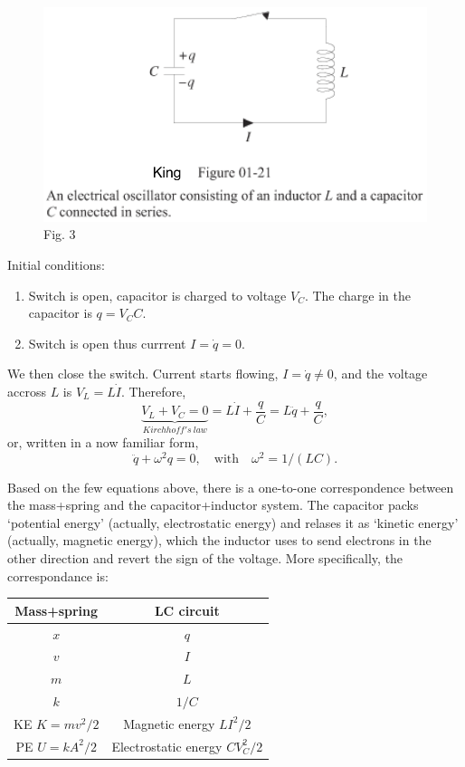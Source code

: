 \documentclass[11pt]{article}
\makeatletter
\def\maxwidth{\ifdim\Gin@nat@width>\linewidth\linewidth
    \else\Gin@nat@width\fi}
\let\Oldincludegraphics\includegraphics
\renewcommand{\includegraphics}[1]{\Oldincludegraphics[width=.8\maxwidth]{#1}}
\makeatother
\begin{document}
    \begin{figure}
\centering
\includegraphics{LC_circuit.png}
\caption{Fig. 3}
\end{figure}

    Initial conditions:

\begin{enumerate}
\def\labelenumi{\arabic{enumi}.}
\item
  Switch is open, capacitor is charged to voltage \(V_C\). The charge in
  the capacitor is \(q = V_C C\).
\item
  Switch is open thus currrent \(I=\dot{q} = 0\).
\end{enumerate}

    We then close the switch. Current starts flowing, \(I = \dot q \neq 0\),
and the voltage accross \(L\) is \(V_L = L \dot I\). Therefore,
\[ \underbrace{V_L+V_C = 0}_{Kirchhof\!f's\ law} = L\dot I + \frac{q}C  = L\ddot q + \frac{q}C, \]
or, written in a now familiar form,
\[ \boxed{\ddot q + \omega^2 q = 0, \quad \textrm{with}\quad \omega^2 = 1/(LC).} \]

    Based on the few equations above, there is a one-to-one correspondence
between the mass+spring and the capacitor+inductor system. The capacitor
packs `potential energy' (actually, electrostatic energy) and relases it
as `kinetic energy' (actually, magnetic energy), which the inductor uses
to send electrons in the other direction and revert the sign of the
voltage. More specifically, the correspondance is:

\begin{longtable}[]{@{}cc@{}}
\toprule
Mass+spring & LC circuit\tabularnewline
\midrule
\endhead
\(x\) & \(q\)\tabularnewline
\(v\) & \(I\)\tabularnewline
\(m\) & \(L\)\tabularnewline
\(k\) & \(1/C\)\tabularnewline
KE \(K = mv^2/2\) & Magnetic energy \(LI^2/2\)\tabularnewline
PE \(U = kA^2/2\) & Electrostatic energy \(CV_C^2/2\)\tabularnewline
\bottomrule
\end{longtable}


    
    
    
    
\end{document}
